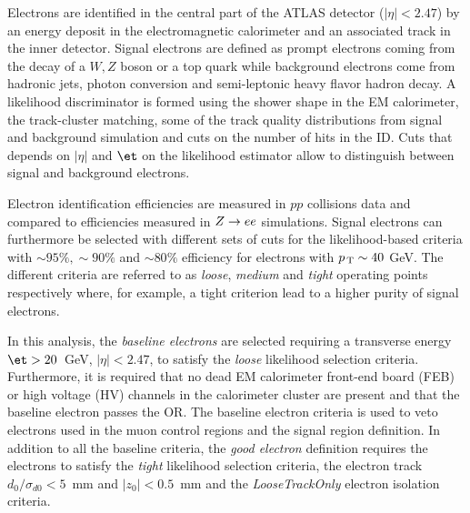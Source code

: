 Electrons are identified in the central part of the ATLAS detector
($|\eta| < 2.47$) by an energy deposit in the electromagnetic calorimeter and an
associated track in the inner detector. Signal electrons are defined as prompt
electrons coming from the decay of a $W, Z$ boson or a top quark while
background electrons come from hadronic jets, photon conversion and
semi-leptonic heavy flavor hadron decay. A likelihood discriminator is formed
using the shower shape in the EM calorimeter, the track-cluster matching, some
of the track quality distributions from signal and background simulation and
cuts on the number of hits in the ID. Cuts that depends on $|\eta|$ and $\et$ on
the likelihood estimator allow to distinguish between signal and background
electrons.

Electron identification efficiencies are measured in $pp$ collisions data and
compared to efficiencies measured in $Z \to e e$ simulations. Signal electrons can
furthermore be selected with different sets of cuts for the likelihood-based
criteria with $\sim 95\%, \sim 90\%$ and $\sim 80\%$ efficiency for electrons
with $p_\mathrm{\, T} \sim 40~$GeV. The different criteria are referred to as \emph{loose},
\emph{medium} and \emph{tight} operating points respectively\cite{ATL-EL-IDENT}
where, for example, a tight criterion lead to a higher purity of signal
electrons.

In this analysis, the \emph{baseline electrons} are selected requiring a
transverse energy $\et > 20$~GeV, $|\eta| < 2.47$, to satisfy the \emph{loose}
likelihood selection criteria. Furthermore, it is required that no dead EM
calorimeter front-end board (FEB) or high voltage (HV) channels in the
calorimeter cluster are present and that the baseline electron passes the
OR. The baseline electron criteria is used to veto electrons used in the muon
control regions and the signal region definition. In addition to all the
baseline criteria, the \emph{good electron} definition requires the electrons to
satisfy the \emph{tight} likelihood selection criteria, the electron track $d_0
/ \sigma_{d0} < 5$~mm and $|z_0| < 0.5$~mm and the \emph{LooseTrackOnly}
electron isolation criteria.

